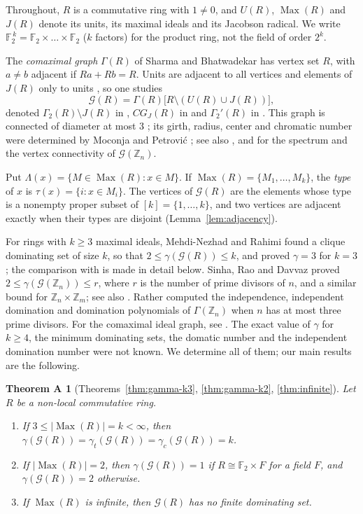\documentclass[11pt]{amsart}
\newtheorem*{theoremA}{Theorem A}
\theoremstyle{definition}
\theoremstyle{remark}
\newcommand{\Max}{\operatorname{Max}}
\newcommand{\Jac}{J}
\newcommand{\G}{\mathcal{G}}
\newcommand{\Z}{\mathbb{Z}}
\newcommand{\FF}{\mathbb{F}}
\newcommand{\Bool}[1]{\FF_2^{\,#1}}
\begin{document}
Throughout, $R$ is a commutative ring with $1\neq 0$, and $U(R)$, $\Max(R)$ and $\Jac(R)$ denote its
units, its maximal ideals and its Jacobson radical. We write $\Bool k=\FF_2\times\dots\times\FF_2$
($k$ factors) for the product ring, not the field of order $2^k$.

The \emph{comaximal graph} $\Gamma(R)$ of Sharma and Bhatwadekar \cite{SB95} has vertex set $R$,
with $a\neq b$ adjacent if $Ra+Rb=R$. Units are adjacent to all vertices and elements of $\Jac(R)$
only to units \cite[Lemma~2.1]{MSSY08}, so one studies
\[
  \G(R)=\Gamma(R)\bigl[R\setminus(U(R)\cup\Jac(R))\bigr],
\]
denoted $\Gamma_2(R)\setminus\Jac(R)$ in \cite{MSSY08}, $CG_J(R)$ in \cite{MR15} and
$\Gamma_2'(R)$ in \cite{SRD21}. This graph is connected of diameter at most $3$ \cite{MSSY08}; its
girth, radius, center and chromatic number were determined by Moconja and Petrovi\'c \cite{MP11};
see also \cite{Sa14,GKJ24}, and \cite{Ra26c,Ra26d} for the spectrum and the vertex connectivity of
$\G(\Z_n)$.

Put $\Lambda(x)=\{M\in\Max(R):x\in M\}$. If $\Max(R)=\{M_1,\dots,M_k\}$, the \emph{type} of $x$ is
$\tau(x)=\{i:x\in M_i\}$. The vertices of $\G(R)$ are the elements whose type is a nonempty proper
subset of $[k]=\{1,\dots,k\}$, and two vertices are adjacent exactly when their types are disjoint
(Lemma~\ref{lem:adjacency}).

For rings with $k\ge3$ maximal ideals, Mehdi-Nezhad and Rahimi \cite{MR15} found a clique
dominating set of size $k$, so that $2\le\gamma(\G(R))\le k$, and proved $\gamma=3$ for $k=3$; the
comparison with \cite{MR15} is made in detail below. Sinha,
Rao and Davvaz \cite{SRD21} proved $2\le\gamma(\G(\Z_n))\le r$, where $r$ is the number of prime
divisors of $n$, and a similar bound for $\Z_n\times\Z_m$; see also \cite{SR20}. Rather
\cite{Ra26a,Ra26b} computed the independence, independent domination and domination polynomials of
$\Gamma(\Z_n)$ when $n$ has at most three prime divisors. For the comaximal ideal graph, see
\cite{DM16,KK20}. The exact value of $\gamma$ for $k\ge4$, the minimum dominating sets, the domatic
number and the independent domination number were not known. We determine all of them; our main
results are the following.

\begin{theoremA}[Theorems~\ref{thm:gamma-k3}, \ref{thm:gamma-k2}, \ref{thm:infinite}]
Let $R$ be a non-local commutative ring.
\begin{enumerate}[label=\textup{(\alph*)}]
\item If $3\le|\Max(R)|=k<\infty$, then
  $\gamma(\G(R))=\gamma_t(\G(R))=\gamma_c(\G(R))=k$.
\item If $|\Max(R)|=2$, then $\gamma(\G(R))=1$ if $R\cong\FF_2\times F$ for a field $F$, and
  $\gamma(\G(R))=2$ otherwise.
\item If $\Max(R)$ is infinite, then $\G(R)$ has no finite dominating set.
\end{enumerate}
\end{theoremA}
\end{document}
